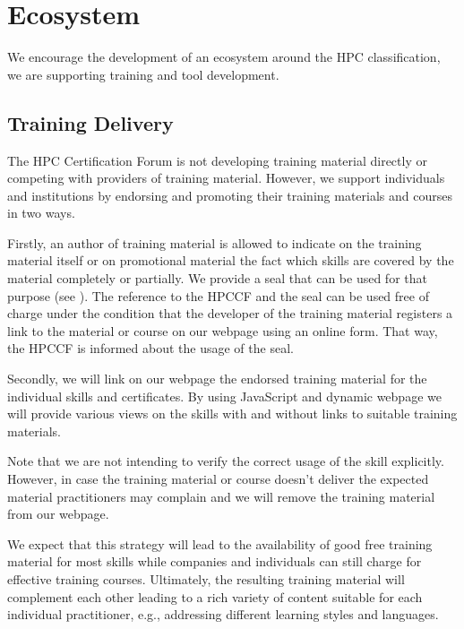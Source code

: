 \documentclass[jocse]{jocseart}
\begin{document}
\section{Ecosystem}
\label{sec:ecosystem}

We encourage the development of an ecosystem around the HPC classification, we are supporting training and tool development.

\subsection{Training Delivery}

The HPC Certification Forum is not developing training material directly or competing with providers of training material.
However, we support individuals and institutions by endorsing and promoting their training materials and courses in two ways.

Firstly, an author of training material is allowed to indicate on the training material itself or on promotional material the fact
which skills are covered by the material completely or partially.
We provide a seal that can be used for that purpose (see ).
The reference to the HPCCF and the seal can be used free of charge under the condition that the developer of the training material
registers a link to the material or course on our webpage using an online form. %
That way, the HPCCF is informed about the usage of the seal.

Secondly, we will link on our webpage the endorsed training material for the individual skills and certificates.
By using JavaScript and dynamic webpage we will provide various views on the skills with and without links to suitable training materials.

Note that we are not intending to verify the correct usage of the skill explicitly.
However, in case the training material or course doesn't deliver the expected material practitioners may complain and we will remove the training material from our webpage.

We expect that this strategy will lead to the availability of good free training material for most skills while companies and individuals can still charge for effective training courses.
Ultimately, the resulting training material will complement each other leading to a rich variety of content suitable for each individual practitioner, e.g., addressing different learning styles and languages.
\end{document}
